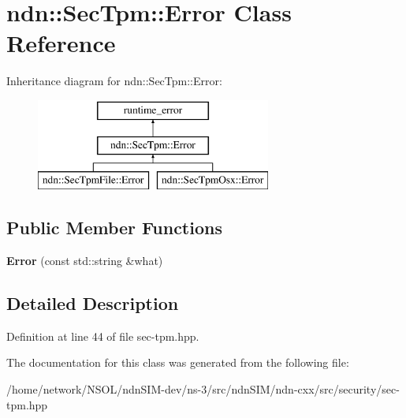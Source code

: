 \hypertarget{classndn_1_1SecTpm_1_1Error}{}\section{ndn\+:\+:Sec\+Tpm\+:\+:Error Class Reference}
\label{classndn_1_1SecTpm_1_1Error}
Inheritance diagram for ndn\+:\+:Sec\+Tpm\+:\+:Error\+:\begin{figure}[H]
\begin{center}
\leavevmode
\includegraphics[height=3.000000cm]{classndn_1_1SecTpm_1_1Error}
\end{center}
\end{figure}
\subsection*{Public Member Functions}
\begin{DoxyCompactItemize}
\item 
{\bfseries Error} (const std\+::string \&what)\hypertarget{classndn_1_1SecTpm_1_1Error_a8bffa49ead1a5125fc91e572c3c422ff}{}\label{classndn_1_1SecTpm_1_1Error_a8bffa49ead1a5125fc91e572c3c422ff}

\end{DoxyCompactItemize}


\subsection{Detailed Description}


Definition at line 44 of file sec-\/tpm.\+hpp.



The documentation for this class was generated from the following file\+:\begin{DoxyCompactItemize}
\item 
/home/network/\+N\+S\+O\+L/ndn\+S\+I\+M-\/dev/ns-\/3/src/ndn\+S\+I\+M/ndn-\/cxx/src/security/sec-\/tpm.\+hpp\end{DoxyCompactItemize}
